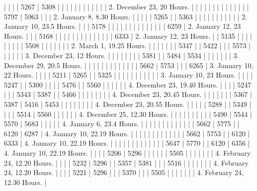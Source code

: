 \documentclass[a4paper, 12pt, oneside, polutonikogreek, english]{article}
\begin{document}
|    |    |    | 5267 | 5308 |    |   |    |    |    |    |    |    |   |    |          | 2. December 23, 20 Hours.    |
|    |    |    |    |   |    |   |    |    |    |    |    | 5797 | 5963 |    |          | 2. January 8, 8.30 Hours.    |
|    |    |    | 5265 |   | 5363 |   |    |    |    |    |    |    |   |    |          | 2. January 10, 23.5 Hours.    |
|    | 5178 |    |    |   |    |   |    |    |    |    |    |    |   |    | 6259        | 2. January 12, 23 Hours.     |
|    | 5168 |    |    |   |    |   |    |    |    |    |    |    |   |    | 6333        | 2. January 12, 23 Hours.     |
| 5135 |    |    |    |   |    |   |    |    | 5508 |    |    |    |   |    |          | 2. March 1, 19.25 Hours.     |
|    |    |    |    |   | 5347 |   | 5422 |    |    | 5573 |    |    |   |    |          | 3. December 23, 12 Hours.    |
|    |    |    |    |   |    | 5381 |    | 5484 | 5534 |    |    |    |   |    |          | 3. December 29, 20.5 Hours.   |
|    |    |    |    |   |    |   |    |    |    |    | 5662 | 5753 |   |    | 6265        | 3. January 10, 22 Hours.     |
|    |    | 5211 | 5265 |   | 5325 |   |    |    |    |    |    |    |   |    |          | 3. January 10, 23 Hours.     |
|    |    | 5247 |    | 5300 |    |   |    | 5476 |    | 5560 |    |    |   |    |          | 4. December 23, 19.40 Hours.   |
|    |    | 5247 |    |   | 5343 | 5387 |    | 5466 |    |    |    |    |   |    |          | 4. December 23, 20.45 Hours.   |
|    |    |    |    |   | 5367 | 5387 | 5416 | 5453 |    |    |    |    |   |    |          | 4. December 23, 20.55 Hours.   |
|    |    |    | 5288 |   | 5349 |   |    |    | 5514 | 5560 |    |    |   |    |          | 4. December 25, 12.30 Hours.   |
|    |    |    |    |   |    |   |    | 5490 | 5544 | 5570 | 5683 |    |   |    |          | 4. January 6, 23.4 Hours.    |
|    |    |    |    |   |    |   |    |    |    |    | 5662 | 5775 |   | 6120 | 6287        | 4. January 10, 22.19 Hours.   |
|    |    |    |    |   |    |   |    |    |    |    | 5662 | 5753 |   | 6120 | 6333        | 4. January 10, 22.19 Hours.   |
|    |    |    |    |   |    |   |    |    |    |    | 5647 | 5770 |   | 6120 | 6356        | 4. January 10, 22.19 Hours.   |
|    |    | 5206 | 5296 |   |    |   |    |    | 5505 |    |    |    |   |    |          | 4. February 24, 12.20 Hours.   |
|    |    | 5232 | 5296 |   | 5357 | 5381 |    |    | 5516 |    |    |    |   |    |          | 4. February 24, 12.20 Hours.   |
|    |    | 5221 | 5296 |   |    | 5370 |    |    | 5505 |    |    |    |   |    |          | 4. February 24, 12.30 Hours.   |
\end{document}
